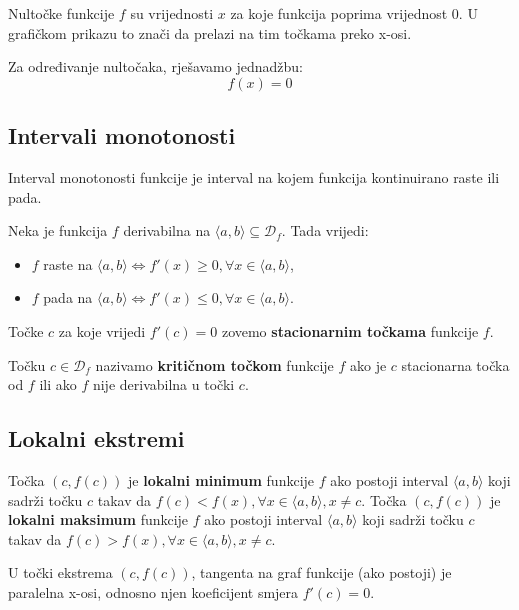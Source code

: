 Nultočke funkcije $f$ su vrijednosti $x$ za koje funkcija poprima vrijednost $0$.
U grafičkom prikazu to znači da prelazi na tim točkama preko x-osi.

Za određivanje nultočaka, rješavamo jednadžbu:
$$
f(x) = 0
$$

\subsection{Intervali monotonosti}

Interval monotonosti funkcije je interval na kojem funkcija kontinuirano raste
ili pada.

\begin{theorem}
    Neka je funkcija $f$ derivabilna na $\langle a,b \rangle \subseteq \mathcal{D}_f$.
    Tada vrijedi:
    \begin{itemize}
        \item $f$ raste na $\langle a,b \rangle \Leftrightarrow f'(x) \geq 0, \forall x \in \langle a,b \rangle$,
        \item $f$ pada na $\langle a,b \rangle \Leftrightarrow f'(x) \leq 0, \forall x \in \langle a,b \rangle$.
    \end{itemize}
\end{theorem}

Točke $c$ za koje vrijedi $f'(c)=0$ zovemo \textbf{stacionarnim točkama}
funkcije $f$.

Točku $c\in \mathcal{D}_f$ nazivamo \textbf{kritičnom točkom} funkcije $f$ ako
je $c$ stacionarna točka od $f$ ili ako $f$ nije derivabilna u točki $c$.

\subsection{Lokalni ekstremi}

\begin{definition}
    Točka $(c, f(c))$ je \textbf{lokalni minimum} funkcije $f$ ako postoji
    interval $\langle a,b \rangle$ koji sadrži točku $c$ takav da
    $f(c)<f(x),\forall x \in \langle a,b \rangle, x\neq c$.
    Točka $(c, f(c))$ je \textbf{lokalni maksimum} funkcije $f$ ako postoji
    interval $\langle a,b \rangle$ koji sadrži točku $c$ takav da
    $f(c)>f(x),\forall x \in \langle a,b \rangle, x\neq c$.
\end{definition}

U točki ekstrema $(c, f(c))$, tangenta na graf funkcije (ako postoji) je
paralelna x-osi, odnosno njen koeficijent smjera $f'(c) = 0$.

